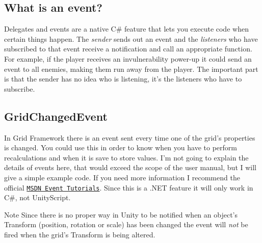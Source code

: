 \subsection*{What is an event? }

Delegates and events are a native C\# feature that lets you execute code when certain things happen. The {\itshape sender} sends out an event and the {\itshape listeners} who have subscribed to that event receive a notification and call an appropriate function. For example, if the player receives an invulnerability power-\/up it could send an event to all enemies, making them run away from the player. The important part is that the sender has no idea who is listening, it's the listeners who have to subscribe.

\subsection*{Grid\+Changed\+Event }

In Grid Framework there is an event sent every time one of the grid's properties is changed. You could use this in order to know when you have to perform recalculations and when it is save to store values. I'm not going to explain the details of events here, that would exceed the scope of the user manual, but I will give a simple example code. If you need more information I recommend the official \href{http://msdn.microsoft.com/en-us/library/aa645739(v=vs.71).aspx}{\tt M\+S\+D\+N Event Tutorials}. Since this is a .N\+E\+T feature it will only work in C\#, not Unity\+Script.

\begin{DoxyNote}{Note}
Since there is no proper way in Unity to be notified when an object's Transform (position, rotation or scale) has been changed the event will {\itshape not} be fired when the grid's Transform is being altered.
\end{DoxyNote}


